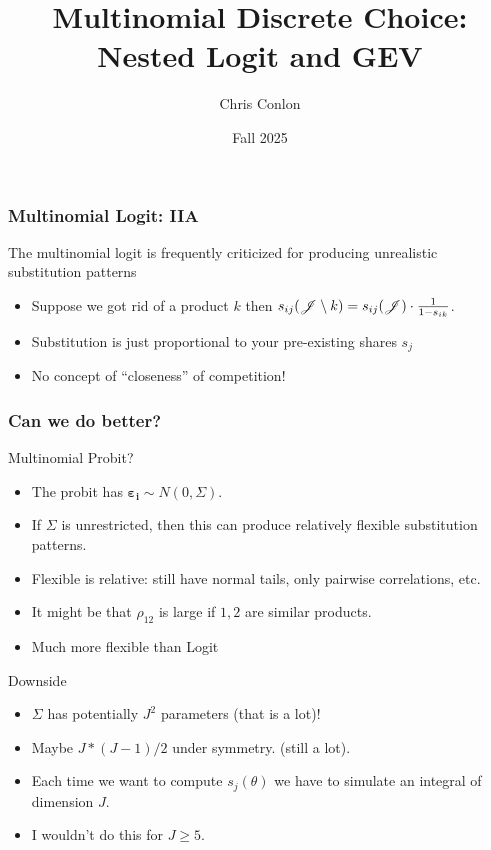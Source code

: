 \documentclass[aspectratio=169,11pt]{beamer}
\begin{document}
\title{Multinomial Discrete Choice: Nested Logit and GEV}
\author{Chris Conlon}
\date{Fall 2025}

\frame{\titlepage}

\begin{frame}
\frametitle{Multinomial Logit: IIA}
The multinomial logit is frequently criticized for producing unrealistic substitution patterns
\begin{itemize}
\item Suppose we got rid of a product $k$ then $s_{ij}(\mathscr{J}\setminus k) = s_{ij}(\mathscr{J})\cdot \frac{1}{1- s_{ik}}$.
\item Substitution is just proportional to your pre-existing shares $s_j$
\item No concept of ``closeness'' of competition!
\end{itemize}
\end{frame}


\begin{frame}
\frametitle{Can we do better?}
Multinomial Probit?
\begin{itemize}
\item The probit has $\symbf{\varepsilon_i} \sim N(0,\Sigma)$.
\item If $\Sigma$ is unrestricted, then this can produce relatively flexible substitution patterns.
\item Flexible is relative: still have normal tails, only pairwise correlations, etc.
\item It might be that $\rho_{12}$ is large if $1,2$ are similar products.
\item Much more flexible than Logit
\end{itemize}
Downside
\begin{itemize}
\item $\Sigma$ has potentially $J^2$ parameters (that is a lot)!
\item Maybe $J * (J-1)/2$ under symmetry. (still a lot).
\item Each time we want to compute $s_j(\theta)$ we have to simulate an integral of dimension $J$.
\item I wouldn't do this for $J \geq 5$.
\end{itemize}
\end{frame}
\end{document}
